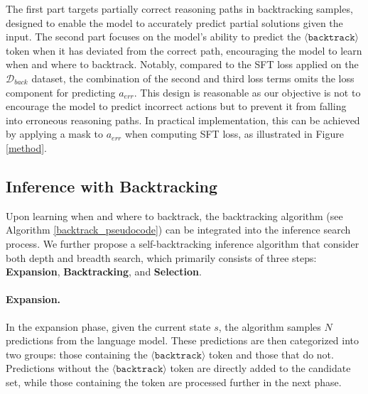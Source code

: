 \documentclass{article}
\theoremstyle{plain}
\theoremstyle{definition}
\theoremstyle{remark}
\begin{document}
 
The first part targets partially correct reasoning paths in backtracking samples, designed to enable the model to accurately predict partial solutions given the input. The second part focuses on the model's ability to predict the $\langle \texttt{backtrack} \rangle$ token when it has deviated from the correct path, encouraging the model to learn when and where to backtrack.  Notably, compared to the SFT loss applied on the $\mathcal{D}_{back}$ dataset, the combination of the second and third loss terms omits the loss component for predicting $a_{err}$.  This design is reasonable as our objective is not to encourage the model to predict incorrect actions but to prevent it from falling into erroneous reasoning paths.  In practical implementation, this can be achieved by applying a mask to $a_{err}$ when computing SFT loss, as illustrated in Figure \ref{method}.

\subsection{Inference with Backtracking}
\label{inference} 
Upon learning when and where to backtrack, the backtracking algorithm (see Algorithm \ref{backtrack_pseudocode}) can be integrated into the inference search process. We further propose a self-backtracking inference algorithm that consider both depth and breadth search, which primarily consists of three steps: \textbf{Expansion}, \textbf{Backtracking}, and \textbf{Selection}.

\paragraph{Expansion.}
In the expansion phase, given the current state \( s \), the algorithm samples \( N \) predictions from the language model. These predictions are then categorized into two groups: those containing the \(\langle \texttt{backtrack} \rangle\) token and those that do not. Predictions without the \(\langle \texttt{backtrack} \rangle\) token are directly added to the candidate set, while those containing the token are processed further in the next phase.
\end{document}
